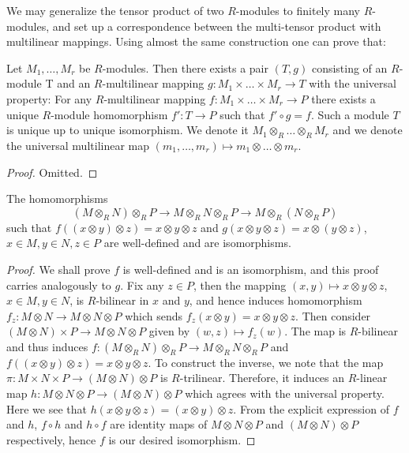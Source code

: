 \noindent
We may generalize the tensor product of two $R$-modules to finitely many
$R$-modules, and set up a
correspondence between the multi-tensor product with multilinear mappings.
Using almost the same construction
one can prove that:

\begin{lemma}
\label{lemma-multilinear}
Let $M_1, \ldots, M_r$ be $R$-modules. Then there exists a pair $(T, g)$
consisting of an $R$-module T and an $R$-multilinear mapping
$g : M_1\times \ldots \times M_r \to T$ with the universal
property: For any $R$-multilinear mapping
$f : M_1\times \ldots \times M_r \to P$ there exists a unique $R$-module
homomorphism $f' : T \to P$ such that $f'\circ g = f$.
Such a module $T$ is unique up to unique isomorphism. We denote it
$M_1\otimes_R \ldots \otimes_R M_r$ and we denote the universal
multilinear map $(m_1, \ldots, m_r) \mapsto m_1 \otimes \ldots \otimes m_r$.
\end{lemma}

\begin{proof}
Omitted.
\end{proof}

\begin{lemma}
\label{lemma-transitive}
The homomorphisms
$$
(M \otimes_R N)\otimes_R P \to
M \otimes_R N \otimes_R P \to
M \otimes_R (N \otimes_R P)
$$
such that
$f((x \otimes y)\otimes z) = x \otimes y \otimes z$
and $g(x \otimes y \otimes z) = x \otimes (y \otimes z)$,
$x\in M, y\in N, z\in P$ are well-defined and are isomorphisms.
\end{lemma}

\begin{proof}
We shall prove $f$ is well-defined and is an isomorphism, and this proof
carries analogously to $g$. Fix any
$z\in P$, then the mapping $(x, y)\mapsto x \otimes y \otimes z$,
$x\in M, y\in N$, is $R$-bilinear in $x$ and $y$,
and hence induces homomorphism $f_z : M \otimes N \to M \otimes N \otimes P$
which sends
$f_z(x \otimes y) = x \otimes y \otimes z$.
Then consider $(M \otimes N)\times P \to M \otimes N \otimes P$ given by
$(w, z)\mapsto f_z(w)$. The map is
$R$-bilinear and thus induces
$f : (M \otimes_R N)\otimes_R P \to M \otimes_R N \otimes_R P$
and $f((x \otimes y)\otimes z) = x \otimes y \otimes z$.
To construct the inverse, we note that the map
$\pi : M \times N \times P \to (M \otimes N)\otimes P$ is
$R$-trilinear.
Therefore, it induces an $R$-linear map
$h : M \otimes N \otimes P \to (M \otimes N)\otimes P$ which
agrees with the universal property. Here we see that
$h(x \otimes y \otimes z) = (x \otimes y)\otimes z$.
From the explicit expression of $f$ and $h$, $f\circ h$ and $h\circ f$ are
identity maps of $M \otimes N \otimes
P$ and $(M \otimes N)\otimes P$ respectively, hence $f$ is our desired
isomorphism.
\end{proof}


